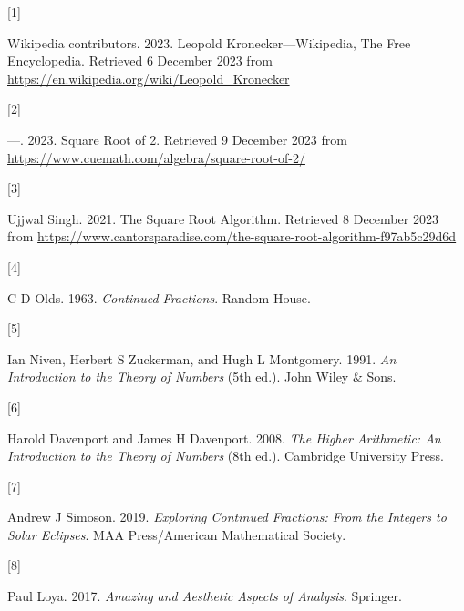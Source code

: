 \documentclass[
  a4paper,
]{article}
\newlength{\cslhangindent}
\newlength{\csllabelwidth}
\newlength{\cslentryspacingunit} %
\newenvironment{CSLReferences}[2] %
 {%
  \setlength{\parindent}{0pt}
  \ifodd #1
  \let\oldpar\par
  \def\par{\hangindent=\cslhangindent\oldpar}
  \fi
  \setlength{\parskip}{#2\cslentryspacingunit}
 }%
 {}
\newcommand{\CSLLeftMargin}[1]{\parbox[t]{\csllabelwidth}{#1}}
\newcommand{\CSLRightInline}[1]{\parbox[t]{\linewidth - \csllabelwidth}{#1}\break}
\begin{document}
\hypertarget{refs}{}
\begin{CSLReferences}{0}{0}
\leavevmode{}%
\CSLLeftMargin{{[}1{]} }%
\CSLRightInline{Wikipedia contributors. 2023. {Leopold
Kronecker---Wikipedia, The Free Encyclopedia}. Retrieved 6 December 2023
from \url{https://en.wikipedia.org/wiki/Leopold_Kronecker}}

\leavevmode{}%
\CSLLeftMargin{{[}2{]} }%
\CSLRightInline{---. 2023. {Square Root of 2}. Retrieved 9 December 2023
from \url{https://www.cuemath.com/algebra/square-root-of-2/}}

\leavevmode{}%
\CSLLeftMargin{{[}3{]} }%
\CSLRightInline{Ujjwal Singh. 2021. {The Square Root Algorithm}.
Retrieved 8 December 2023 from
\url{https://www.cantorsparadise.com/the-square-root-algorithm-f97ab5c29d6d}}

\leavevmode{}%
\CSLLeftMargin{{[}4{]} }%
\CSLRightInline{C D Olds. 1963. \emph{{Continued Fractions}}. Random
House.}

\leavevmode{}%
\CSLLeftMargin{{[}5{]} }%
\CSLRightInline{Ian Niven, Herbert S Zuckerman, and Hugh L Montgomery.
1991. \emph{{An Introduction to the Theory of Numbers}} (5th ed.). John
Wiley \& Sons.}

\leavevmode{}%
\CSLLeftMargin{{[}6{]} }%
\CSLRightInline{Harold Davenport and James H Davenport. 2008. \emph{{The
Higher Arithmetic}: {An Introduction to the Theory of Numbers}} (8th
ed.). Cambridge University Press.}

\leavevmode{}%
\CSLLeftMargin{{[}7{]} }%
\CSLRightInline{Andrew J Simoson. 2019. \emph{{Exploring Continued
Fractions}: {From the Integers to Solar Eclipses}}. MAA Press/American
Mathematical Society.}

\leavevmode{}%
\CSLLeftMargin{{[}8{]} }%
\CSLRightInline{Paul Loya. 2017. \emph{{Amazing and Aesthetic Aspects of
Analysis}}. Springer.}

\end{CSLReferences}
\end{document}
